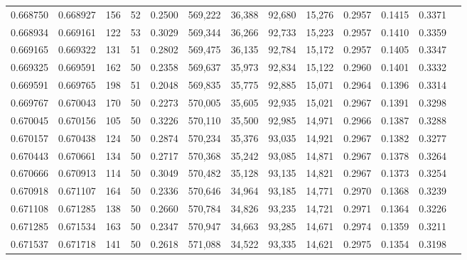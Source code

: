 \begin{tabular}{rrrrrrrrrrrrr}
0.668750 & 0.668927 &   156 &  52 &                                     0.2500 & 569,222 &  36,388 &  92,680 &  15,276 & 0.2957 & 0.1415 & 0.3371 \\
0.668934 & 0.669161 &   122 &  53 &                                     0.3029 & 569,344 &  36,266 &  92,733 &  15,223 & 0.2957 & 0.1410 & 0.3359 \\
0.669165 & 0.669322 &   131 &  51 &                                     0.2802 & 569,475 &  36,135 &  92,784 &  15,172 & 0.2957 & 0.1405 & 0.3347 \\
0.669325 & 0.669591 &   162 &  50 &                                     0.2358 & 569,637 &  35,973 &  92,834 &  15,122 & 0.2960 & 0.1401 & 0.3332 \\
0.669591 & 0.669765 &   198 &  51 &                                     0.2048 & 569,835 &  35,775 &  92,885 &  15,071 & 0.2964 & 0.1396 & 0.3314 \\
0.669767 & 0.670043 &   170 &  50 &                                     0.2273 & 570,005 &  35,605 &  92,935 &  15,021 & 0.2967 & 0.1391 & 0.3298 \\
0.670045 & 0.670156 &   105 &  50 &                                     0.3226 & 570,110 &  35,500 &  92,985 &  14,971 & 0.2966 & 0.1387 & 0.3288 \\
0.670157 & 0.670438 &   124 &  50 &                                     0.2874 & 570,234 &  35,376 &  93,035 &  14,921 & 0.2967 & 0.1382 & 0.3277 \\
0.670443 & 0.670661 &   134 &  50 &                                     0.2717 & 570,368 &  35,242 &  93,085 &  14,871 & 0.2967 & 0.1378 & 0.3264 \\
0.670666 & 0.670913 &   114 &  50 &                                     0.3049 & 570,482 &  35,128 &  93,135 &  14,821 & 0.2967 & 0.1373 & 0.3254 \\
0.670918 & 0.671107 &   164 &  50 &                                     0.2336 & 570,646 &  34,964 &  93,185 &  14,771 & 0.2970 & 0.1368 & 0.3239 \\
0.671108 & 0.671285 &   138 &  50 &                                     0.2660 & 570,784 &  34,826 &  93,235 &  14,721 & 0.2971 & 0.1364 & 0.3226 \\
0.671285 & 0.671534 &   163 &  50 &                                     0.2347 & 570,947 &  34,663 &  93,285 &  14,671 & 0.2974 & 0.1359 & 0.3211 \\
0.671537 & 0.671718 &   141 &  50 &                                     0.2618 & 571,088 &  34,522 &  93,335 &  14,621 & 0.2975 & 0.1354 & 0.3198 \\

\end{tabular}
